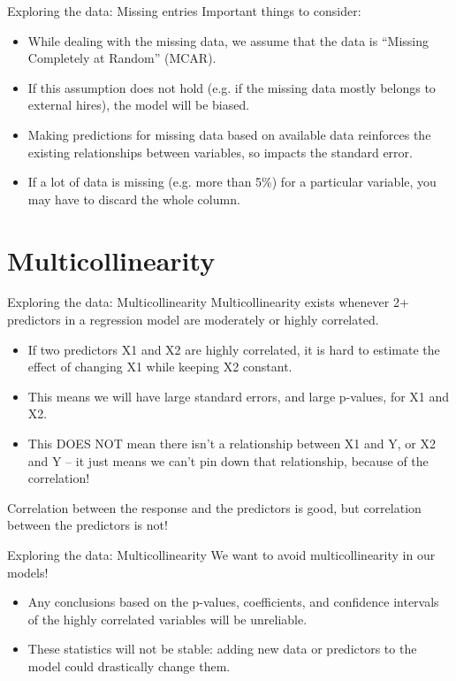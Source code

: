 \documentclass{beamer}\usepackage[]{graphicx}\usepackage[]{color}
\begin{document}
\begin{darkframes}
\begin{frame}[fragile]{Exploring the data: Missing entries}
      \alert{Important things to consider:}
      \begin{itemize}[<+->]
        \item While dealing with the missing data, we assume that the data is ``Missing Completely at Random'' (MCAR).
        \item If this assumption does not hold (e.g. if the missing data mostly belongs to external hires), the model will  be biased.
        \item Making predictions for missing data based on available data reinforces the existing relationships between variables, so impacts the standard error.
        \item If a lot of data is missing (e.g. more than 5\%) for a particular variable, you may have to discard the whole column.
      \end{itemize}
\end{frame}

    \section{Multicollinearity}


\begin{frame}[fragile]{Exploring the data: Multicollinearity}
      Multicollinearity exists whenever 2+ predictors in a regression model are moderately or highly correlated. \pause
      \begin{itemize}[<+->]
        \item If two predictors X1 and X2 are highly correlated, it is hard to estimate the effect of changing X1 while keeping X2 constant.
        \item This means we will have large standard errors, and large p-values, for X1 and X2.
        \item This DOES NOT mean there isn't a relationship between X1 and Y, or X2 and Y -- it just means we can't pin down that relationship, because of the correlation!
      \end{itemize}
      \pause
      Correlation between the response and the predictors is good, but correlation between the predictors is not!
\end{frame}


\begin{frame}[fragile]{Exploring the data: Multicollinearity}
      We want to avoid multicollinearity in our models! \pause
      \begin{itemize}[<+->]
        \item Any conclusions based on the p-values, coefficients, and confidence intervals of the highly correlated variables will be unreliable.
        \item These statistics will not be stable: adding new data or predictors to the model could drastically change them.
      \end{itemize}


\end{frame}
\end{darkframes}
\end{document}
